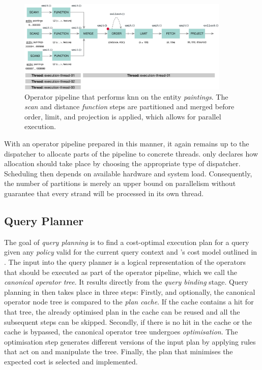 \begin{figure}[bt]
    \centering
    \includegraphics[width=0.9\textwidth]{figures/execution-model-parallel}
    \caption{Operator pipeline that performs \acrshort{knn} on the entity \emph{paintings}. The \emph{scan} and distance \emph{function} steps are partitioned and merged before order, limit, and projection is applied, which allows for parallel execution.}
    \label{figure:cottontail_execution_model_parallel}
\end{figure}

With an operator pipeline prepared in this manner, it again remains up to the dispatcher to allocate parts of the pipeline to concrete threads. \cottontail{} only declares how allocation should take place by choosing the appropriate type of dispatcher. Scheduling then depends on available hardware and system load. Consequently, the number of partitions is merely an upper bound on parallelism without guarantee that every strand will be processed in its own thread. 

\subsection{Query Planner}
\label{section:cottontail_query_planner}

The goal of \emph{query planning} is to find a cost-optimal execution plan for a query given any \emph{policy} valid for the current query context and \cottontail{}'s cost model outlined in . The input into the query planner is a logical representation of the operators that should be executed as part of the operator pipeline, which we call the \emph{canonical operator tree}. It results directly from the \emph{query binding} stage. Query planning in \cottontail{} then takes place in three steps: Firstly, and optionally, the canonical operator node tree is compared to the \emph{plan cache}. If the cache contains a hit for that tree, the already optimised plan in the cache can be reused and all the subsequent steps can be skipped. Secondly, if there is no hit in the cache or the cache is bypassed, the canonical operator tree undergoes \emph{optimisation}. The optimisation step generates different versions of the input plan by applying rules that act on and manipulate the tree. Finally, the plan that minimises the expected cost is selected and implemented.


